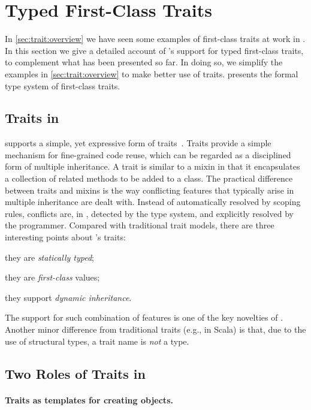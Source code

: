 \section{Typed First-Class Traits}
\label{sec:traits}

In \cref{sec:trait:overview} we have seen some examples of first-class traits at work
in \sedel. In this section we give a detailed account of \sedel's support for
typed first-class traits, to complement what has been presented so far. In doing so,
we simplify the examples in \cref{sec:trait:overview} to make better use of traits.
 presents the formal type system of first-class traits.

\subsection{Traits in \sedel}

\sedel supports a simple, yet expressive form of traits~\citep{scharli2003traits}.
Traits provide a simple mechanism for fine-grained code reuse, which
can be regarded as a disciplined form of multiple inheritance. A trait is
similar to a mixin in that it encapsulates a collection of related methods to be
added to a class. The
practical difference between traits and mixins is the way conflicting features
that typically arise in multiple inheritance are dealt with. Instead of
automatically resolved by scoping rules, conflicts are, in \sedel,
detected by the type system, and explicitly resolved by the programmer. Compared
with traditional trait models, there are three interesting points about
\sedel's traits:
\begin{inparaenum}[(1)]
\item they are \emph{statically typed};
\item they are \emph{first-class} values;
\item they support \emph{dynamic inheritance}.
\end{inparaenum}
The support for such combination of features is one of the key novelties of \sedel.
Another minor difference from traditional traits (e.g., in Scala) is that,
due to the use of structural types, a trait name is \emph{not} a type.

\subsection{Two Roles of Traits in \sedel}

\paragraph{Traits as templates for creating objects.}

